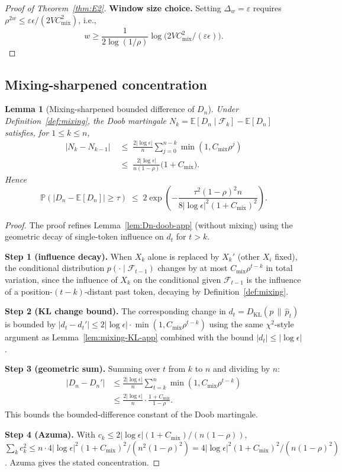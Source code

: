 \documentclass[11pt]{article}
\newcommand{\E}{\mathbb{E}}
\newcommand{\Prob}{\mathbb{P}}
\newcommand{\F}{\mathcal{F}}
\newcommand{\KL}[2]{D_{\mathrm{KL}}(#1 \,\|\, #2)}
\theoremstyle{plain}
\newtheorem{lemma}[theorem]{Lemma}
\theoremstyle{definition}
\theoremstyle{remark}
\begin{document}
\begin{proof}[Proof of Theorem~\ref{thm:E2}]
\textbf{Window size choice.}
Setting $\Delta_w = \varepsilon$ requires
$\rho^{2w} \leq \varepsilon \epsilon / (2 V C_{\mathrm{mix}}^2)$, i.e.,
\[
w \geq \frac{1}{2 \log(1/\rho)} \log\big(2VC_{\mathrm{mix}}^2/(\varepsilon \epsilon)\big).
\]
\end{proof}

\subsection{Mixing-sharpened concentration}\label{app:mixing-concentration}

\begin{lemma}[Mixing-sharpened bounded difference of $D_n$]
\label{lem:Dn-doob-mixing-app}
Under Definition~\ref{def:mixing}, the Doob martingale
$N_k = \E[D_n \mid \F_k] - \E[D_n]$ satisfies, for $1 \leq k \leq n$,
\[
\begin{split}
|N_k - N_{k-1}|
&\;\leq\;
\frac{2 |\log\epsilon|}{n} \sum_{j=0}^{n-k} \min(1, C_{\mathrm{mix}}\rho^j)\\
&\;\leq\;
\frac{2 |\log\epsilon|}{n(1-\rho)} \big(1 + C_{\mathrm{mix}}\big).
\end{split}
\]
Hence
\[
\Prob(|D_n - \E[D_n]| \geq \tau)
\;\leq\;
2 \exp\!\left( -\frac{\tau^2 (1-\rho)^2 n}{8 |\log\epsilon|^2 (1+C_{\mathrm{mix}})^2} \right).
\]
\end{lemma}

\begin{proof}
The proof refines Lemma~\ref{lem:Dn-doob-app} (without mixing) using
the geometric decay of single-token influence on $d_t$ for $t > k$.

\textbf{Step 1 (influence decay).}
When $X_k$ alone is replaced by $X_k'$ (other $X_i$ fixed), the
conditional distribution $p(\cdot \mid \F_{t-1})$ changes by at most
$C_{\mathrm{mix}} \rho^{t-k}$ in total variation, since the influence
of $X_k$ on the conditional given $\F_{t-1}$ is the influence of a
position-$(t-k)$-distant past token, decaying by Definition~\ref{def:mixing}.

\textbf{Step 2 (KL change bound).}
The corresponding change in $d_t = \KL{p}{\hat p_t}$ is bounded by
$|d_t - d_t'| \leq 2 |\log\epsilon| \cdot \min(1, C_{\mathrm{mix}}\rho^{t-k})$
using the same $\chi^2$-style argument as Lemma~\ref{lem:mixing-KL-app}
combined with the bound $|d_t| \leq |\log\epsilon|$.

\textbf{Step 3 (geometric sum).}
Summing over $t$ from $k$ to $n$ and dividing by $n$:
\[
\begin{split}
|D_n - D_n'| &\leq \frac{2|\log\epsilon|}{n} \sum_{t=k}^n \min(1, C_{\mathrm{mix}}\rho^{t-k})\\
&\leq \frac{2|\log\epsilon|}{n} \cdot \frac{1 + C_{\mathrm{mix}}}{1-\rho}.
\end{split}
\]
This bounds the bounded-difference constant of the Doob martingale.

\textbf{Step 4 (Azuma).}
With $c_k \leq 2|\log\epsilon|(1+C_{\mathrm{mix}})/(n(1-\rho))$,
$\sum_k c_k^2 \leq n \cdot 4|\log\epsilon|^2(1+C_{\mathrm{mix}})^2 / (n^2(1-\rho)^2)
= 4|\log\epsilon|^2(1+C_{\mathrm{mix}})^2/(n(1-\rho)^2)$. Azuma
gives the stated concentration.
\end{proof}
\end{document}
